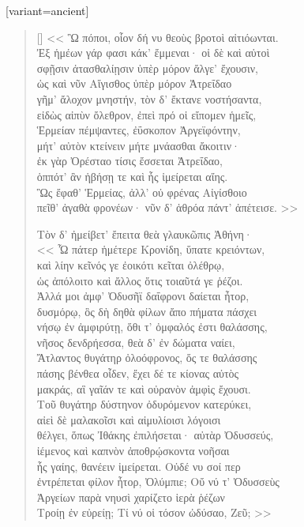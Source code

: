 \documentclass[10pt]{article}
\begin{document}
\begin{greek}[variant=ancient]
\begin{verse}[\versewidth]
<< Ὣ πόποι, οἷον δή νυ θεοὺς βροτοὶ αἰτιόωνται.\\
Ἐξ ἡμέων γάρ φασι κάκ' ἔμμεναι· οἱ δὲ καὶ αὐτοὶ\\
σφῇσιν ἀτασθαλίῃσιν ὑπὲρ μόρον ἄλγε' ἔχουσιν,\\
ὡς καὶ νῦν Αἴγισθος ὑπὲρ μόρον Ἀτρεΐδαο \\
γῆμ' ἄλοχον μνηστήν, τὸν δ' ἔκτανε νοστήσαντα,\\
εἰδὼς αἰπὺν ὄλεθρον, ἐπεὶ πρό οἱ εἴπομεν ἡμεῖς,\\
Ἑρμείαν πέμψαντες, ἐΰσκοπον Ἀργεϊφόντην,\\
μήτ' αὐτὸν κτείνειν μήτε μνάασθαι ἄκοιτιν·\\
ἐκ γὰρ Ὀρέσταο τίσις ἔσσεται Ἀτρεΐδαο, \\
ὁππότ' ἂν ἡβήσῃ τε καὶ ἧς ἱμείρεται αἴης.\\
Ὣς ἔφαθ' Ἑρμείας, ἀλλ' οὐ φρένας Αἰγίσθοιο\\
πεῖθ' ἀγαθὰ φρονέων· νῦν δ' ἁθρόα πάντ' ἀπέτεισε. >>

Τὸν δ' ἠμείβετ' ἔπειτα θεὰ γλαυκῶπις Ἀθήνη·       \\
<< Ὦ πάτερ ἡμέτερε Κρονίδη, ὕπατε κρειόντων, \\
καὶ λίην κεῖνός γε ἐοικότι κεῖται ὀλέθρῳ,\\
ὡς ἀπόλοιτο καὶ ἄλλος ὅτις τοιαῦτά γε ῥέζοι.\\
Ἀλλά μοι ἀμφ' Ὀδυσῆϊ δαΐφρονι δαίεται ἦτορ,\\
δυσμόρῳ, ὃς δὴ δηθὰ φίλων ἄπο πήματα πάσχει\\
νήσῳ ἐν ἀμφιρύτῃ, ὅθι τ' ὀμφαλός ἐστι θαλάσσης,\\ 
νῆσος δενδρήεσσα, θεὰ δ' ἐν δώματα ναίει,\\
Ἄτλαντος θυγάτηρ ὀλοόφρονος, ὅς τε θαλάσσης\\
πάσης βένθεα οἶδεν, ἔχει δέ τε κίονας αὐτὸς\\
μακράς, αἳ γαῖάν τε καὶ οὐρανὸν ἀμφὶς ἔχουσι.\\
Τοῦ θυγάτηρ δύστηνον ὀδυρόμενον κατερύκει, \\
αἰεὶ δὲ μαλακοῖσι καὶ αἱμυλίοισι λόγοισι\\
θέλγει, ὅπως Ἰθάκης ἐπιλήσεται· αὐτὰρ Ὀδυσσεύς,\\
ἱέμενος καὶ καπνὸν ἀποθρῴσκοντα νοῆσαι\\
ἧς γαίης, θανέειν ἱμείρεται. Οὐδέ νυ σοί περ\\
ἐντρέπεται φίλον ἦτορ, Ὀλύμπιε; Οὔ νύ τ' Ὀδυσσεὺς \\
Ἀργείων παρὰ νηυσὶ χαρίζετο ἱερὰ ῥέζων\\
Τροίῃ ἐν εὐρείῃ; Τί νύ οἱ τόσον ὠδύσαο, Ζεῦ; >>
\end{verse}
\end{greek}
\pagebreak
\end{document}
